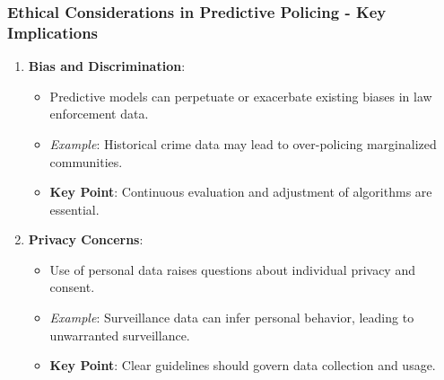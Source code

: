 \documentclass[aspectratio=169]{beamer}
\begin{document}
\begin{frame}[fragile]
    \frametitle{Ethical Considerations in Predictive Policing - Key Implications}
    \begin{enumerate}
        \item \textbf{Bias and Discrimination}:
            \begin{itemize}
                \item Predictive models can perpetuate or exacerbate existing biases in law enforcement data.
                \item \textit{Example}: Historical crime data may lead to over-policing marginalized communities.
                \item \textbf{Key Point}: Continuous evaluation and adjustment of algorithms are essential.
            \end{itemize}
        
        \item \textbf{Privacy Concerns}:
            \begin{itemize}
                \item Use of personal data raises questions about individual privacy and consent.
                \item \textit{Example}: Surveillance data can infer personal behavior, leading to unwarranted surveillance.
                \item \textbf{Key Point}: Clear guidelines should govern data collection and usage.
            \end{itemize}
    \end{enumerate}
\end{frame}
\end{document}
